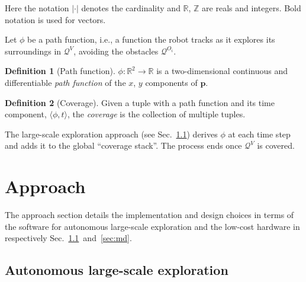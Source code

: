 \documentclass[lettersize,journal]{IEEEtran}
\theoremstyle{definition}
\newtheorem{defn}{Definition}[section]
\begin{document}
Here the notation $|\cdot|$ denotes the cardinality and $\mathbb{R}$, $\mathbb{Z}$ are reals and integers. Bold notation is used for vectors.

Let $\phi$ be a path function, i.e., a function the robot tracks as it explores its surroundings in $\mathcal{Q}^V$, avoiding the obstacles $\mathcal{Q}^{O_i}$.

\begin{defn}[Path function]\label{def:pf}
  $\phi:\mathbb{R}^2\rightarrow\mathbb{R}$ is a two-dimensional continuous and differentiable \textit{path function} of the $x$, $y$ components of $\mathbf{p}$.
\end{defn}

\begin{defn}[Coverage]\label{def:co}
  Given a tuple with a path function and its time component, $\langle\phi,t\rangle$, the \textit{coverage} is the collection of multiple tuples.
\end{defn}

The large-scale exploration approach %
(see Sec.~\ref{sec:le}) derives $\phi$ at each time step and adds it to the global ``coverage stack''. The process ends once $\mathcal{Q}^V$ is covered.

\section{Approach}
\label{sec:m}

The approach section details the implementation and design choices in terms of %
the software for autonomous large-scale exploration and the low-cost hardware in respectively Sec.~\ref{sec:le}~and~\ref{sec:md}.

\subsection{Autonomous large-scale exploration}
\label{sec:le}
\end{document}
